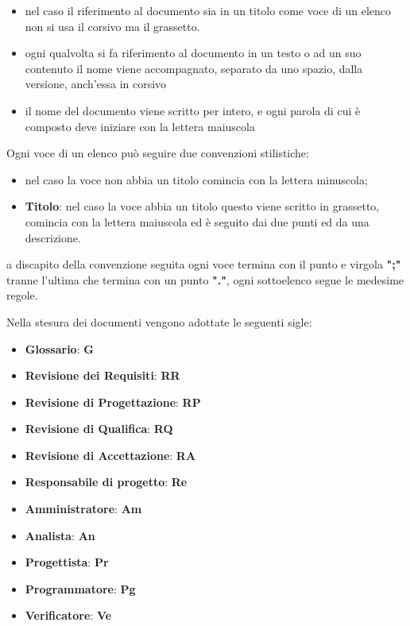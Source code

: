 	    \begin{itemize}
	        \item nel caso il riferimento al documento sia in un titolo come voce di un elenco non si usa il corsivo ma il grassetto.
	        \item ogni qualvolta si fa riferimento al documento in un testo o ad un suo contenuto il nome viene accompagnato, separato da uno spazio, dalla versione, anch'essa in corsivo
	        \item il nome del documento viene scritto per intero, e ogni parola di cui è composto deve iniziare con la lettera maiuscola
	    \end{itemize}
	    
	    Ogni voce di un elenco può seguire due convenzioni stilistiche:
	    \begin{itemize}
	        \item nel caso la voce non abbia un titolo comincia con la lettera minuscola;
	        \item \textbf{Titolo}: nel caso la voce abbia un titolo questo viene scritto in grassetto, comincia con la lettera maiuscola ed è seguito dai due punti ed da una descrizione.
	    \end{itemize}
	    a discapito della convenzione seguita ogni voce termina con il punto e virgola \textbf{";"} tranne l'ultima che termina con un punto \textbf{"."}, ogni sottoelenco 
	    segue le medesime regole.
	    
	    Nella stesura dei documenti vengono adottate le seguenti sigle:
	    \begin{itemize}
	        \item \textbf{Glossario}: \textbf{G}
	        \item \textbf{Revisione dei Requisiti}: \textbf{RR}
	        \item \textbf{Revisione di Progettazione}: \textbf{RP}
	        \item \textbf{Revisione di Qualifica}: \textbf{RQ}
	        \item \textbf{Revisione di Accettazione}: \textbf{RA}
	        \item \textbf{Responsabile di progetto}: \textbf{Re}
	        \item \textbf{Amministratore}: \textbf{Am}
	        \item \textbf{Analista}: \textbf{An}
	        \item \textbf{Progettista}: \textbf{Pr}
	        \item \textbf{Programmatore}: \textbf{Pg}
	        \item \textbf{Verificatore}: \textbf{Ve}
	    \end{itemize}
	    
